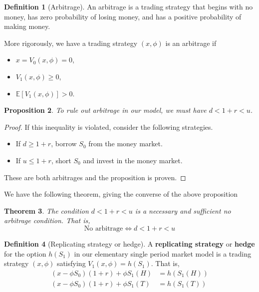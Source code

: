 \documentclass[10pt, oneside, reqno]{amsart}
\theoremstyle{plain}%
\newtheorem{thm}{Theorem}[subsection]
\newtheorem{prop}[thm]{Proposition}
\theoremstyle{definition}
\newtheorem{defn}[thm]{Definition}
\theoremstyle{remark}
\newcommand{\expc}[1]{\mathbb{E}\left[#1\right]}
\begin{document}
\begin{defn}[Arbitrage]
    An arbitrage is a trading strategy that begins with no money, has zero probability of losing money, and has a positive probability of making money.
    
    More rigorously, we have a trading strategy $(x,\phi)$ is an arbitrage if
    \begin{itemize}
        \item $x = V_0(x,\phi) = 0$, 
        \item $V_1(x,\phi) \geq 0$,
        \item $\expc{V_1(x,\phi)} > 0$. 
    \end{itemize}

\end{defn}

\begin{prop}
    To rule out arbitrage in our model, we must have $d < 1+r < u$.  
\end{prop}

\begin{proof}
    If this inequality is violated, consider the following strategies.
    \begin{itemize}
        \item   If $d \geq 1+r$, borrow $S_0$ from the money market.
        \item If $u \leq 1+r$, short $S_0$ and invest in the money market.
    \end{itemize}
    
    These are both arbitrages and the proposition is proven.
\end{proof}


We have the following theorem, giving the converse of the above proposition
\begin{thm}
    The condition $d < 1+r < u$ is a necessary and sufficient no arbitrage condition.  That is,
    \[
        \text{No arbitrage} \iff d < 1+r < u
    \]
\end{thm}


\begin{defn}[Replicating strategy or hedge]
    A \textbf{replicating strategy} or \textbf{hedge} for the option $h(S_1)$ in our elementary single period market model is a trading strategy $(x,\phi)$ satisfying $V_1(x,\phi) = h(S_1)$.  That is,
    \begin{align*}
        (x-\phi S_0)(1+r) + \phi S_1(H)     &= h(S_1(H))\\
        (x - \phi S_0)(1+r) + \phi S_1(T)   &= h(S_1(T))
    \end{align*}
\end{defn}
\end{document}

